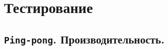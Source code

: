 \documentclass[t]{beamer}  %
\begin{document}
\begin{frame}[fragile]
\begin{figure}[H]
	\end{figure}
 \end{frame}

 \section{Тестирование}
 \subsection{\texttt{Ping-pong}. Производительность.}
\end{document}

